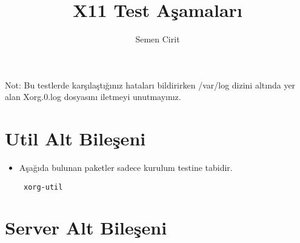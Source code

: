 \documentclass[a4paper,10pt]{article}
\title{X11 Test Aşamaları}
\author{Semen Cirit}
\begin{document}
\maketitle

Not: Bu testlerde karşılaştığınız hataları bildirirken /var/log dizini altında yer alan Xorg.0.log
dosyasını iletmeyi unutmayınız.
\section{Util Alt Bileşeni}

\begin{itemize}
 \item Aşağıda bulunan paketler sadece kurulum testine tabidir.
\begin{verbatim}
 xorg-util
\end{verbatim}

\end{itemize}

\section{Server Alt Bileşeni}
\end{document}
